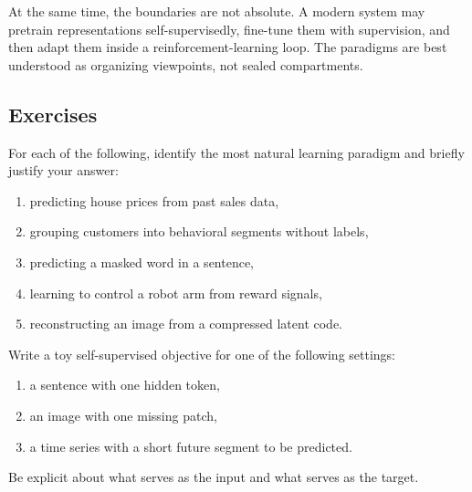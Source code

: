 At the same time, the boundaries are not absolute. A modern system may pretrain representations self-supervisedly, fine-tune them with supervision, and then adapt them inside a reinforcement-learning loop. The paradigms are best understood as organizing viewpoints, not sealed compartments.


\subsection*{Exercises}

\begin{exercise}
For each of the following, identify the most natural learning paradigm and briefly justify your answer:
\begin{enumerate}
    \item predicting house prices from past sales data,
    \item grouping customers into behavioral segments without labels,
    \item predicting a masked word in a sentence,
    \item learning to control a robot arm from reward signals,
    \item reconstructing an image from a compressed latent code.
\end{enumerate}
\end{exercise}

\begin{exercise}
Write a toy self-supervised objective for one of the following settings:
\begin{enumerate}
    \item a sentence with one hidden token,
    \item an image with one missing patch,
    \item a time series with a short future segment to be predicted.
\end{enumerate}
Be explicit about what serves as the input and what serves as the target.
\end{exercise}

